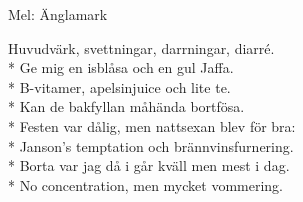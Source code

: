 \begin{SongText}[Bakfyllesång]
    \begin{SongInfo}
        Mel: Änglamark
    \end{SongInfo}
    \begin{SongVerse}
        Huvudvärk, svettningar, darrningar, diarré.\\*%
        Ge mig en isblåsa och en gul Jaffa.\\*%
        B-vitamer, apelsinjuice och lite te.\\*%
        Kan de bakfyllan måhända bortfösa.\\*%
        Festen var dålig, men nattsexan blev för bra:\\*%
        Janson's temptation och brännvinsfurnering.\\*%
        Borta var jag då i går kväll men mest i dag.\\*%
        No concentration, men mycket vommering.
    \end{SongVerse}
\end{SongText}

